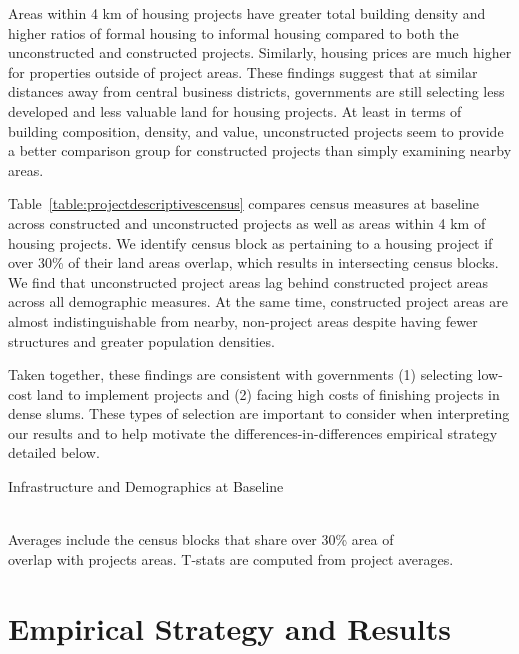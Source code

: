 \documentclass[12pt]{article}
\begin{document}
Areas within 4 km of housing projects have greater total building density and higher ratios of  formal housing to informal housing compared to both the unconstructed and constructed projects.  Similarly, housing prices are much higher for properties outside of project areas.  These findings suggest that at similar distances away from central business districts, governments are still selecting less developed and less valuable land for housing projects.  At least in terms of building composition, density, and value, unconstructed projects seem to provide a better comparison group for constructed projects than simply examining nearby areas.  

Table~\ref{table:projectdescriptivescensus} compares census measures at baseline across constructed and unconstructed projects as well as areas within 4 km of housing projects.  We identify census block as pertaining to a housing project if over 30\% of their land areas overlap, which results in intersecting census blocks.  We find that unconstructed project areas lag behind constructed project areas across all demographic measures.  At the same time, constructed project areas are almost indistinguishable from nearby, non-project areas despite having fewer structures and greater population densities.

Taken together, these findings are consistent with governments (1) selecting low-cost land to implement projects and (2) facing high costs of finishing projects in dense slums.  These types of selection are important to consider when interpreting our results and to help motivate the differences-in-differences empirical strategy detailed below.

\begin{table}
	\centering
	\caption{Infrastructure and Demographics at Baseline}\label{table:projectdescriptivescensus}
%
 \\
\vspace{.2cm}
\footnotesize{Averages include the census blocks that share over 30\% area of \\ overlap with projects areas.  T-stats are computed from project averages.}
\end{table}

\section{Empirical Strategy and Results}\label{section:results}
\end{document}
